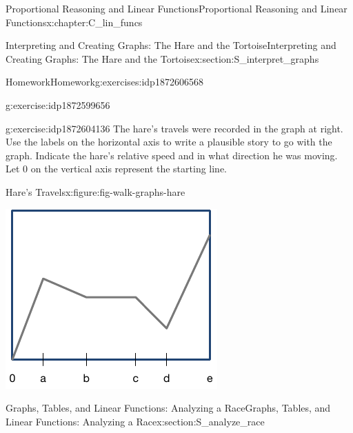 \documentclass[oneside,10pt,]{book}
\numberwithin{equation}{chapter}
\begin{document}
\begin{chapterptx}{Proportional Reasoning and Linear Functions}{}{Proportional Reasoning and Linear Functions}{}{}{x:chapter:C_lin_funcs}
\begin{sectionptx}{Interpreting and Creating Graphs: The Hare and the Tortoise}{}{Interpreting and Creating Graphs: The Hare and the Tortoise}{}{}{x:section:S_interpret_graphs}
\begin{exercises-subsection}{Homework}{}{Homework}{}{}{g:exercises:idp1872606568}
\begin{divisionexercise}{1}{}{}{g:exercise:idp1872599656}
\begin{enumerate}[font=\bfseries,label=(\alph*),ref=\alph*]
%
\end{enumerate}
\end{divisionexercise}%
\begin{divisionexercise}{2}{}{}{g:exercise:idp1872604136}%
The hare's travels were recorded in the graph at right. Use the labels on the horizontal axis to write a plausible story to go with the graph. Indicate the hare's relative speed and in what direction he was moving. Let 0 on the vertical axis represent the starting line.%
\begin{figureptx}{Hare's Travels}{x:figure:fig-walk-graphs-hare}{}%
\begin{image}{0.25}{0.5}{0.25}%
\includegraphics[width=\linewidth]{external/exer-walk-graphs-hare.pdf}
\end{image}%
\tcblower
\end{figureptx}%
\end{divisionexercise}%
\end{exercises-subsection}
\end{sectionptx}
%
%
\typeout{************************************************}
\typeout{************************************************}
%
\begin{sectionptx}{Graphs, Tables, and Linear Functions: Analyzing a Race}{}{Graphs, Tables, and Linear Functions: Analyzing a Race}{}{}{x:section:S_analyze_race}
%
%
\typeout{************************************************}

\end{sectionptx}
\end{chapterptx}
\end{document}
